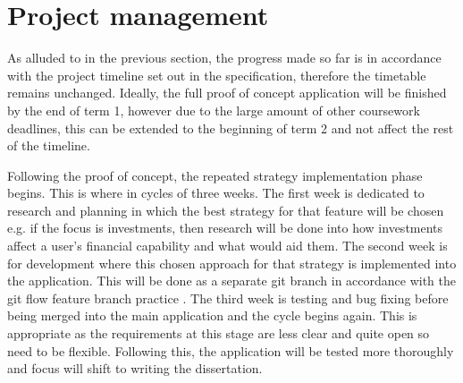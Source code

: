 \section{Project management}

As alluded to in the previous section, the progress made so far is in accordance with the project timeline set out in the specification, therefore the timetable remains unchanged. Ideally, the full proof of concept application will be finished by the end of term 1, however due to the large amount of other coursework deadlines, this can be extended to the beginning of term 2 and not affect the rest of the timeline.

Following the proof of concept, the repeated strategy implementation phase begins. This is where in cycles of three weeks. The first week is dedicated to research and planning in which the best strategy for that feature will be chosen e.g. if the focus is investments, then research will be done into how investments affect a user's financial capability and what would aid them. The second week is for development where this chosen approach for that strategy is implemented into the application. This will be done as a separate git branch in accordance with the git flow feature branch practice \cite{GitFlow}. The third week is testing and bug fixing before being merged into the main application and the cycle begins again. This is appropriate as the requirements at this stage are less clear and quite open so need to be flexible. Following this, the application will be tested more thoroughly and focus will shift to writing the dissertation.